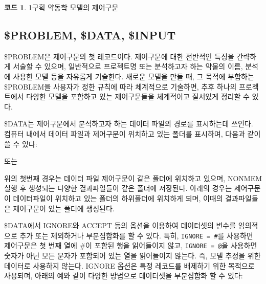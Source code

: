 \documentclass[
  10pt,
  krantz2,
  a4paper]{krantz}
\newenvironment{Shaded}{\begin{snugshade}}{\end{snugshade}}
\newcommand{\ErrorTok}[1]{\textcolor[rgb]{0.64,0.00,0.00}{\textbf{#1}}}
\newcommand{\NormalTok}[1]{#1}
\newcommand{\OperatorTok}[1]{\textcolor[rgb]{0.81,0.36,0.00}{\textbf{#1}}}
\newcommand{\StringTok}[1]{\textcolor[rgb]{0.31,0.60,0.02}{#1}}
\newenvironment{Shaded}{\begin{snugshade}}{\end{snugshade}}
\theoremstyle{definition}
\theoremstyle{definition}
\newtheorem{example}{코드}[chapter]
\theoremstyle{definition}
\theoremstyle{remark}
\begin{document}
\begin{example}
\protect\hypertarget{exm:one-comp}{}{\label{exm:one-comp} }1구획 약동학 모델의 제어구문
\end{example}


\hypertarget{problem-data-input}{%
\subsection{\$PROBLEM, \$DATA, \$INPUT}\label{problem-data-input}}

\$PROBLEM은 제어구문의 첫 레코드이다. 제어구문에 대한 전반적인 특징을 간략하게 서술할 수 있으며, 일반적으로 프로젝트명 또는 분석하고자 하는 약물의 이름, 분석에 사용한 모델 등을 자유롭게 기술한다. 새로운 모델을 만들 때, 그 목적에 부합하는 \$PROBLEM을 사용자가 정한 규칙에 따라 체계적으로 기술하면, 추후 하나의 프로젝트에서 다양한 모델을 포함하고 있는 제어구문들을 체계적이고 질서있게 정리할 수 있다.

\$DATA는 제어구문에서 분석하고자 하는 데이터 파일의 경로를 표시하는데 쓰인다. 컴퓨터 내에서 데이터 파일과 제어구문이 위치하고 있는 폴더를 표시하며, 다음과 같이 쓸 수 있다:

\begin{Shaded}
\end{Shaded}

또는

\begin{Shaded}
\end{Shaded}

위의 첫번째 경우는 데이터 파일 제어구문이 같은 폴더에 위치하고 있으며, NONMEM 실행 후 생성되는 다양한 결과파일들이 같은 폴더에 저장된다. 아래의 경우는 제어구문이 데이터파일이 위치하고 있는 폴더의 하위폴더에 위치하게 되며, 이때의 결과파일들은 제어구문이 있는 폴더에 생성된다.

\$DATA에서 IGNORE와 ACCEPT 등의 옵션을 이용하여 데이터셋의 변수를 임의적으로 추가 또는 제외하거나 부분집합화를 할 수 있다. 특히, \texttt{IGNORE\ =\ \#}를 사용하면 제어구문은 첫 번째 열에 \#이 포함된 행을 읽어들이지 않고, \texttt{IGNORE\ =\ @}을 사용하면 숫자가 아닌 모든 문자가 포함되어 있는 열을 읽어들이지 않는다. 즉, 모델 추정을 위한 데이터로 사용하지 않는다. IGNORE 옵션은 특정 레코드를 배제하기 위한 목적으로 사용되며, 아래의 예와 같이 다양한 방법으로 데이터셋을 부분집합화 할 수 있다:
\end{document}
